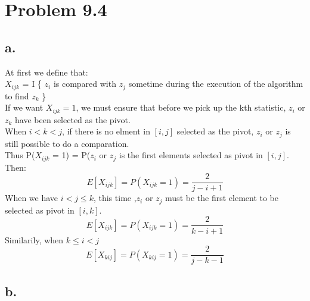 \documentclass[oneside]{homework} %
\begin{document}
\maketitle
\newpage

\section*{Problem 9.4}
\subsection* {a.}
At first we define that: 
\\  $X_{ijk}$  = I \{ $z_{i}$ is compared with $z_{j}$ sometime during the execution of the algorithm to find $z_{k}$ \}
\\If we want $X_{ijk} = 1$, we must ensure that before we pick up the kth statistic, $z_{i}$ or $z_{k}$ have been selected as the pivot.
\\When $i < k < j$, if there is no elment in $[i,j]$ selected as the pivot, $z_{i}$ or $z_{j}$ is still possible to do a comparation. 
\\Thus P($X_{ijk}$ = 1) = P($z_{i}$ or $z_{j}$ is the first elements selected as pivot in $[i,j]$.
Then:
\begin{equation}
  E[X_{ijk}] = P(X_{ijk}=1) = \frac{2}{j-i+1}
  \label{equ:ikj}
\end{equation}
When we have $i < j \leq k$, this time ,$z_{i}$ or $z_{j}$ must be the first element to be selected as pivot in $[i,k]$.
\begin{equation}
  E[X_{ijk}] = P(X_{ijk}=1) = \frac{2}{k-i+1}
  \label{equ:ijk}
\end{equation}
Similarily, when $ k \leq i < j $
\begin{equation}
  E[X_{kij}] = P(X_{kij}=1) = \frac{2}{j-k-1}
  \label{equ:kij}
\end{equation}

\subsection*{b.}
\end{document}
